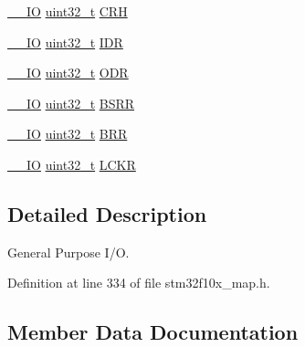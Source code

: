 \begin{DoxyCompactItemize}
\item 
\hyperlink{group___c_m_s_i_s___c_m3__core__definitions_gaec43007d9998a0a0e01faede4133d6be}{\+\_\+\+\_\+\+IO} \hyperlink{_p_e___types_8h_a33594304e786b158f3fb30289278f5af}{uint32\+\_\+t} \hyperlink{struct_g_p_i_o___type_def_afe53502a3dbf9e7dcf9ac83f67ac481d}{C\+RH}
\item 
\hyperlink{group___c_m_s_i_s___c_m3__core__definitions_gaec43007d9998a0a0e01faede4133d6be}{\+\_\+\+\_\+\+IO} \hyperlink{_p_e___types_8h_a33594304e786b158f3fb30289278f5af}{uint32\+\_\+t} \hyperlink{struct_g_p_i_o___type_def_acf11156409414ad8841bb0b62959ee96}{I\+DR}
\item 
\hyperlink{group___c_m_s_i_s___c_m3__core__definitions_gaec43007d9998a0a0e01faede4133d6be}{\+\_\+\+\_\+\+IO} \hyperlink{_p_e___types_8h_a33594304e786b158f3fb30289278f5af}{uint32\+\_\+t} \hyperlink{struct_g_p_i_o___type_def_a6fb78f4a978a36032cdeac93ac3c9c8b}{O\+DR}
\item 
\hyperlink{group___c_m_s_i_s___c_m3__core__definitions_gaec43007d9998a0a0e01faede4133d6be}{\+\_\+\+\_\+\+IO} \hyperlink{_p_e___types_8h_a33594304e786b158f3fb30289278f5af}{uint32\+\_\+t} \hyperlink{struct_g_p_i_o___type_def_acd6f21e08912b484c030ca8b18e11cd6}{B\+S\+RR}
\item 
\hyperlink{group___c_m_s_i_s___c_m3__core__definitions_gaec43007d9998a0a0e01faede4133d6be}{\+\_\+\+\_\+\+IO} \hyperlink{_p_e___types_8h_a33594304e786b158f3fb30289278f5af}{uint32\+\_\+t} \hyperlink{struct_g_p_i_o___type_def_aab918bfbfae459789db1fd0b220c7f21}{B\+RR}
\item 
\hyperlink{group___c_m_s_i_s___c_m3__core__definitions_gaec43007d9998a0a0e01faede4133d6be}{\+\_\+\+\_\+\+IO} \hyperlink{_p_e___types_8h_a33594304e786b158f3fb30289278f5af}{uint32\+\_\+t} \hyperlink{struct_g_p_i_o___type_def_a95a59d4b1d52be521f3246028be32f3e}{L\+C\+KR}
\end{DoxyCompactItemize}


\subsection{Detailed Description}
General Purpose I/O. 

Definition at line 334 of file stm32f10x\+\_\+map.\+h.



\subsection{Member Data Documentation}
